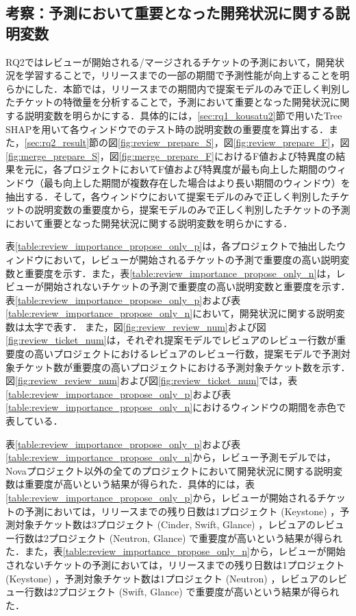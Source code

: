 \documentclass[submit]{ipsj}
\begin{document}
\subsection{考察：予測において重要となった開発状況に関する説明変数}\label{sec:rq2_kousatu}
RQ2ではレビューが開始される/マージされるチケットの予測において，開発状況を学習することで，リリースまでの一部の期間で予測性能が向上することを明らかにした．本節では，リリースまでの期間内で提案モデルのみで正しく判別したチケットの特徴量を分析することで，予測において重要となった開発状況に関する説明変数を明らかにする．具体的には，\ref{sec:rq1_kousatu2}節で用いたTree SHAPを用いて各ウィンドウでのテスト時の説明変数の重要度を算出する．また，\ref{sec:rq2_result}節の図\ref{fig:review_prepare_S}，図\ref{fig:review_prepare_F}，図\ref{fig:merge_prepare_S}，図\ref{fig:merge_prepare_F}におけるF値および特異度の結果を元に，各プロジェクトにおいてF値および特異度が最も向上した期間のウィンドウ（最も向上した期間が複数存在した場合はより長い期間のウィンドウ）を抽出する．そして，各ウィンドウにおいて提案モデルのみで正しく判別したチケットの説明変数の重要度から，提案モデルのみで正しく判別したチケットの予測において重要となった開発状況に関する説明変数を明らかにする．

表\ref{table:review_importance_propose_only_p}は，各プロジェクトで抽出したウィンドウにおいて，レビューが開始されるチケットの予測で重要度の高い説明変数と重要度を示す．また，表\ref{table:review_importance_propose_only_n}は，レビューが開始されないチケットの予測で重要度の高い説明変数と重要度を示す．表\ref{table:review_importance_propose_only_p}および表\ref{table:review_importance_propose_only_n}において，開発状況に関する説明変数は太字で表す．
また，図\ref{fig:review_review_num}および図\ref{fig:review_ticket_num}は，それぞれ提案モデルでレビュアのレビュー行数が重要度の高いプロジェクトにおけるレビュアのレビュー行数，提案モデルで予測対象チケット数が重要度の高いプロジェクトにおける予測対象チケット数を示す．図\ref{fig:review_review_num}および図\ref{fig:review_ticket_num}では，表\ref{table:review_importance_propose_only_p}および表\ref{table:review_importance_propose_only_n}におけるウィンドウの期間を赤色で表している．

表\ref{table:review_importance_propose_only_p}および表\ref{table:review_importance_propose_only_n}から，レビュー予測モデルでは，Novaプロジェクト以外の全てのプロジェクトにおいて開発状況に関する説明変数は重要度が高いという結果が得られた．具体的には，表\ref{table:review_importance_propose_only_p}から，レビューが開始されるチケットの予測においては，リリースまでの残り日数は1プロジェクト (Keystone) ，予測対象チケット数は3プロジェクト (Cinder, Swift, Glance) ，レビュアのレビュー行数は2プロジェクト (Neutron, Glance) で重要度が高いという結果が得られた．また，表\ref{table:review_importance_propose_only_n}から，レビューが開始されないチケットの予測においては，リリースまでの残り日数は1プロジェクト (Keystone) ，予測対象チケット数は1プロジェクト (Neutron) ，レビュアのレビュー行数は2プロジェクト (Swift, Glance) で重要度が高いという結果が得られた．
\end{document}
